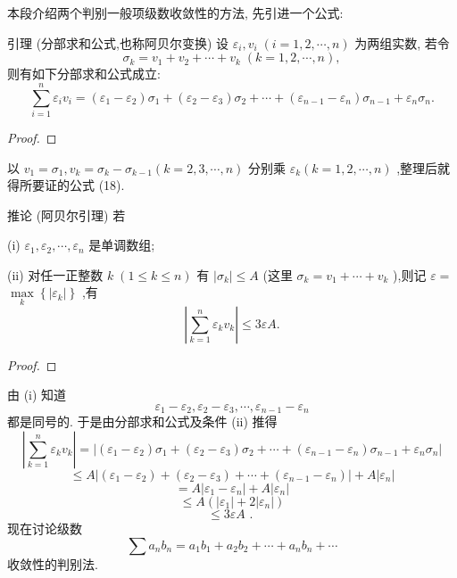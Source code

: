 本段介绍两个判别一般项级数收敛性的方法, 先引进一个公式:

引理 (分部求和公式,也称阿贝尔变换) 设 \({\varepsilon }_{i},{v}_{i}\;\left( {i = 1,2,\cdots ,n}\right)\) 为两组实数, 若令
\[
{\sigma }_{k} = {v}_{1} + {v}_{2} + \cdots  + {v}_{k}\;\left( {k = 1,2,\cdots ,n}\right) ,
\]
则有如下分部求和公式成立:
\[
\mathop{\sum }\limits_{{i = 1}}^{n}{\varepsilon }_{i}{v}_{i} = \left( {{\varepsilon }_{1} - {\varepsilon }_{2}}\right) {\sigma }_{1} + \left( {{\varepsilon }_{2} - {\varepsilon }_{3}}\right) {\sigma }_{2} + \cdots  + \left( {{\varepsilon }_{n - 1} - {\varepsilon }_{n}}\right) {\sigma }_{n - 1} + {\varepsilon }_{n}{\sigma }_{n}. \tag{18}
\]
\begin{proof}

\end{proof}
以 \({v}_{1} = {\sigma }_{1},{v}_{k} = {\sigma }_{k} - {\sigma }_{k - 1}\left( {k = 2,3,\cdots ,n}\right)\) 分别乘 \({\varepsilon }_{k}\left( {k = 1,2,\cdots ,n}\right)\) ,整理后就得所要证的公式 (18).

推论 (阿贝尔引理) 若

(i) \({\varepsilon }_{1},{\varepsilon }_{2},\cdots ,{\varepsilon }_{n}\) 是单调数组;

(ii) 对任一正整数 \(k\;\left( {1 \leq  k \leq  n}\right)\) 有 \(\left| {\sigma }_{k}\right|  \leq  A\) (这里 \({\sigma }_{k} = {v}_{1} + \cdots  + {v}_{k}\) ),则记 \(\varepsilon  =\)  \(\mathop{\max }\limits_{k}\left\{  \left| {\varepsilon }_{k}\right| \right\}\) ,有
\[
\left| {\mathop{\sum }\limits_{{k = 1}}^{n}{\varepsilon }_{k}{v}_{k}}\right|  \leq  {3\varepsilon A}. \tag{19}
\]
\begin{proof}

\end{proof}
由 (i) 知道
\[
{\varepsilon }_{1} - {\varepsilon }_{2},{\varepsilon }_{2} - {\varepsilon }_{3},\cdots ,{\varepsilon }_{n - 1} - {\varepsilon }_{n}
\]
都是同号的. 于是由分部求和公式及条件 (ii) 推得
\[
\left| {\mathop{\sum }\limits_{{k = 1}}^{n}{\varepsilon }_{k}{v}_{k}}\right|  = \left| {\left( {{\varepsilon }_{1} - {\varepsilon }_{2}}\right) {\sigma }_{1} + \left( {{\varepsilon }_{2} - {\varepsilon }_{3}}\right) {\sigma }_{2} + \cdots  + \left( {{\varepsilon }_{n - 1} - {\varepsilon }_{n}}\right) {\sigma }_{n - 1} + {\varepsilon }_{n}{\sigma }_{n}}\right|
\]
\[
\leq  A\left| {\left( {{\varepsilon }_{1} - {\varepsilon }_{2}}\right)  + \left( {{\varepsilon }_{2} - {\varepsilon }_{3}}\right)  + \cdots  + \left( {{\varepsilon }_{n - 1} - {\varepsilon }_{n}}\right) }\right|  + A\left| {\varepsilon }_{n}\right|
\]
\[
= A\left| {{\varepsilon }_{1} - {\varepsilon }_{n}}\right|  + A\left| {\varepsilon }_{n}\right|
\]
\[
\leq  A\left( {\left| {\varepsilon }_{1}\right|  + 2\left| {\varepsilon }_{n}\right| }\right)
\]
\[
\leq  {3\varepsilon A}\text{ . }
\]
现在讨论级数
\[
\sum {a}_{n}{b}_{n} = {a}_{1}{b}_{1} + {a}_{2}{b}_{2} + \cdots  + {a}_{n}{b}_{n} + \cdots  \tag{20}
\]
收敛性的判别法.

